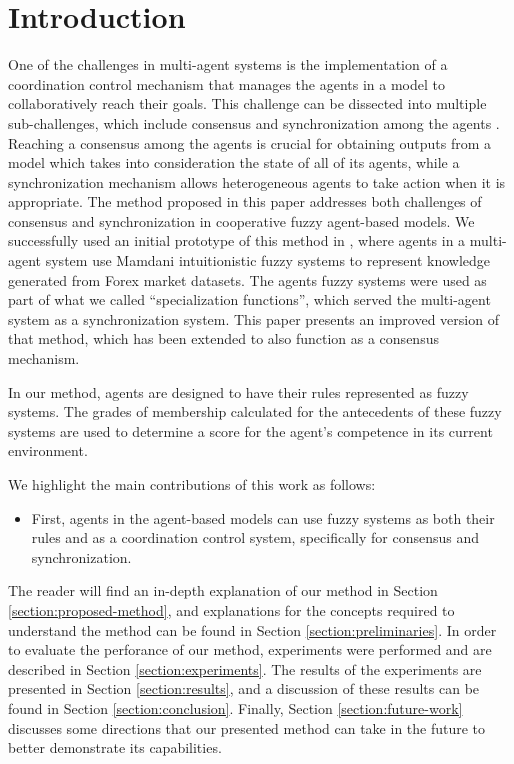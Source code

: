 \section{Introduction}
\label{section:introduction}

One of the challenges in multi-agent systems is the implementation of
a coordination control mechanism that manages the agents in a model to
collaboratively reach their goals. This challenge can be dissected
into multiple sub-challenges, which include consensus and
synchronization among the agents \cite{dorri2018multi}. Reaching a
consensus among the agents is crucial for obtaining outputs from a
model which takes into consideration the state of all of its agents,
while a synchronization mechanism allows heterogeneous agents to take
action when it is appropriate. The method proposed in this paper
addresses both challenges of consensus and synchronization in
cooperative fuzzy agent-based models. We successfully used an initial
prototype of this method in \cite{hernandez2021using}, where agents in
a multi-agent system use Mamdani intuitionistic fuzzy systems to
represent knowledge generated from Forex market datasets. The agents
fuzzy systems were used as part of what we called ``specialization
functions'', which served the multi-agent system as a synchronization
system. This paper presents an improved version of that method, which
has been extended to also function as a consensus mechanism.

In our method, agents are designed to have their rules represented as
fuzzy systems. The grades of membership calculated for the antecedents
of these fuzzy systems are used to determine a score for the agent's
competence in its current environment. %

We highlight the main contributions of this work as follows:
\begin{itemize}
  \item First, agents in the agent-based models can use fuzzy systems
as both their rules and as a coordination control system, specifically
for consensus and synchronization.
\end{itemize}

The reader will find an in-depth explanation of our method in Section
\ref{section:proposed-method}, and explanations for the concepts
required to understand the method can be found in Section
\ref{section:preliminaries}. In order to evaluate the perforance of
our method, experiments were performed and are described in Section
\ref{section:experiments}. The results of the experiments are
presented in Section \ref{section:results}, and a discussion of these
results can be found in Section \ref{section:conclusion}. Finally,
Section \ref{section:future-work} discusses some directions that our
presented method can take in the future to better demonstrate its
capabilities.